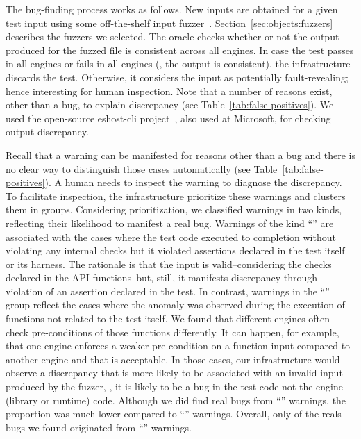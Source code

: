 \documentclass[10pt,conference,anonymous]{IEEEtran}
\begin{document}
The bug-finding process works as follows. New inputs are obtained for
a given test input using some off-the-shelf input
fuzzer~\cite{fuzz-testing-history}.
Section~\ref{sec:objects:fuzzers} describes the fuzzers we selected.
The oracle checks whether or not the output produced for the fuzzed
file is consistent across all engines. In case the test passes in all
engines or fails in all engines (\ie{}, the output is consistent), the
infrastructure discards the test. Otherwise, it considers the input as
potentially fault-revealing; hence interesting for human
inspection. Note that a number of reasons exist, other than a bug, to
explain discrepancy (see Table~\ref{tab:false-positives}). We used the
open-source eshost-cli project~\cite{eshost-cli}, also used at
Microsoft, for checking output discrepancy.


Recall that a warning can be manifested for reasons other than a bug
and there is no clear way to distinguish those cases automatically (see
Table~\ref{tab:false-positives}). A human needs to inspect the warning
to diagnose the discrepancy. To facilitate inspection, the
infrastructure prioritize these warnings and clusters them in
groups. Considering prioritization, we classified warnings in two
kinds, reflecting their likelihood to manifest a real bug. Warnings of
the kind ``\hi{}'' are associated with the cases where the test code
executed to completion without violating any internal checks but it
violated assertions declared in the test itself or its harness. The
rationale is that the input is valid--considering the checks declared
in the API functions--but, still, it manifests discrepancy through
violation of an assertion declared in the test. In contrast, warnings
in the ``\lo{}'' group reflect the cases where the anomaly was
observed during the execution of functions not related to the test
itself. We found that different engines often check pre-conditions of
those functions differently. It can happen, for example, that one
engine enforces a weaker pre-condition on a function input compared to
another engine and that is acceptable. In those cases, our infrastructure would
observe a discrepancy that is more likely to be associated with an
invalid input produced by the fuzzer, \ie{}, it is likely to be a bug
in the test code not the engine (library or runtime) code. Although we
did find real bugs from ``\lo{}'' warnings, the proportion was much
lower compared to ``\hi{}'' warnings. Overall, only  of the
reals bugs we found originated from ``\lo{}'' warnings.
\end{document}
